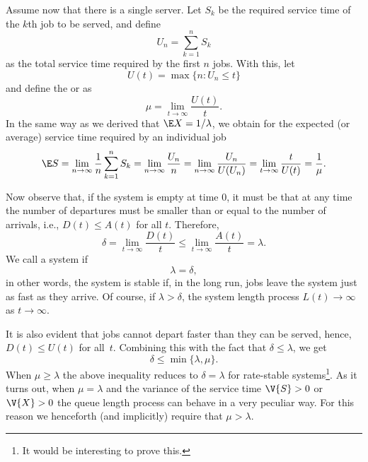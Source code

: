Assume now that there is a single server.
Let $S_k$ be the required service time of the $k$th job to be served, and define
\begin{equation*}
U_n = \sum_{k=1}^n S_k
\end{equation*}
as the total service time required by the first $n$ jobs. With this,
let 
\begin{equation*}
 U(t) = \max\{n: U_n \leq t\}
\end{equation*}
and define the  or  as
\begin{equation*}
 \mu = \lim_{t\to\infty} \frac{U(t)}t.
\end{equation*}
In the same way as we derived that $\E X= 1/\lambda$, we obtain for the expected (or average) service time required by an individual job
\begin{equation*}
 \E S = \lim_{n\to\infty} \frac 1 n \sum_{k=1}^n S_k = \lim_{n\to\infty} \frac{U_n}{n} = \lim_{n\to\infty} \frac{U_n}{U(U_n)} = \lim_{t\to\infty} \frac t{U(t)} = \frac 1 \mu.
\end{equation*}

Now observe that, if the system is empty at time $0$, it must be that
at any time the number of departures must be smaller than or equal to the number
of arrivals, i.e., $D(t) \leq A(t)$ for all $t$. Therefore,
\begin{equation}\label{eq:26}
\delta = \lim_{t\to\infty} \frac{D(t)}t \leq \lim_{t\to\infty} \frac{A(t)}t = \lambda.
\end{equation}
We call a system  if
\begin{equation*}
 \lambda = \delta,
\end{equation*}
in other words, the system is stable if, in the long run, jobs leave
the system just as fast as they arrive. Of course, if
$\lambda > \delta$, the system length process $L(t) \to \infty$ as
$t\to \infty$.

It is also evident that jobs cannot depart faster than they can be
served, hence, $D(t) \leq U(t)$ for all~$t$. Combining this with the
fact that $\delta \leq \lambda$, we get
\begin{equation*}
 \delta \leq \min\{\lambda, \mu\}.
\end{equation*}
When $\mu \geq \lambda$ the above inequality reduces to $\delta = \lambda$ for rate-stable systems\footnote{\hspace{0.1em}It would be interesting to prove this.}.
As it turns out, when $\mu = \lambda$ and the variance of the service time $\V{S} > 0$ or $\V{X} >0$ the queue length process can behave in a very peculiar way.
For this reason we henceforth (and implicitly) require that $\mu > \lambda$.



